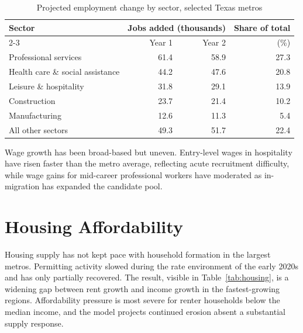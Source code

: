 \documentclass[11pt]{article}
\begin{document}
\begin{table}[htbp]
  \caption{Projected employment change by sector, selected Texas metros}
  \label{tab:employment}
  \centering
  \begin{tabular}{lrrr}
    \toprule
    Sector & \multicolumn{2}{c}{Jobs added (thousands)} & Share of total \\
    \cmidrule(lr){2-3}
           & Year 1 & Year 2 & (\%) \\
    \midrule
    Professional services & 61.4 & 58.9 & 27.3 \\
    Health care \& social assistance & 44.2 & 47.6 & 20.8 \\
    Leisure \& hospitality & 31.8 & 29.1 & 13.9 \\
    Construction & 23.7 & 21.4 & 10.2 \\
    Manufacturing & 12.6 & 11.3 & 5.4 \\
    All other sectors & 49.3 & 51.7 & 22.4 \\
    \bottomrule
  \end{tabular}
\end{table}

Wage growth has been broad-based but uneven. Entry-level wages in hospitality
have risen faster than the metro average, reflecting acute recruitment
difficulty, while wage gains for mid-career professional workers have moderated
as in-migration has expanded the candidate pool.

\section{Housing Affordability}
\label{sec:housing}

Housing supply has not kept pace with household formation in the largest
metros. Permitting activity slowed during the rate environment of the early
2020s and has only partially recovered. The result, visible in
Table~\ref{tab:housing}, is a widening gap between rent growth and income
growth in the fastest-growing regions. Affordability pressure is most severe
for renter households below the median income, and the model projects continued
erosion absent a substantial supply response.
\end{document}

